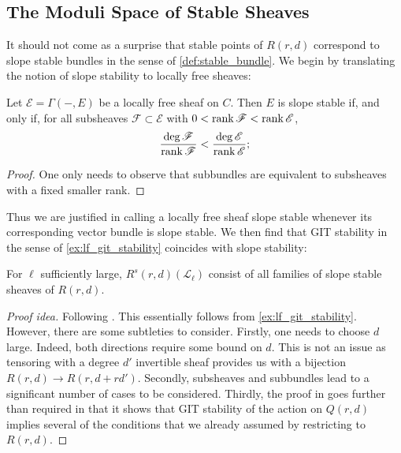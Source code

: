 \documentclass[12pt]{ociamthesis}  %
\begin{document}
\subsection{The Moduli Space of Stable Sheaves}

It should not come as a surprise that stable points of
$R(r,d)$ correspond to slope stable bundles
in the sense of \ref{def:stable_bundle}.
We begin by translating the notion of slope stability to
locally free sheaves:

\begin{lemma}
  Let $\mathscr E=\Gamma(-,E)$ be a locally free sheaf on $C$.
  Then $E$ is slope stable if, and only if, for all subsheaves
  $\mathscr F\subset\mathscr E$ with $0<\operatorname{rank}\mathscr F<\operatorname{rank}\mathscr E$,
  \begin{align}\label{eq:sheaf_slope_stability}
    \frac{\deg\mathscr F}{\operatorname{rank}\mathscr F}<\frac{\deg\mathscr E}{\operatorname{rank}\mathscr E};
  \end{align}
  \begin{proof}
    One only needs to observe that subbundles are equivalent to
    subsheaves with a fixed smaller rank.
  \end{proof}
\end{lemma}

Thus we are justified in calling a locally free sheaf slope stable
whenever its corresponding vector bundle is slope stable. We
then find that GIT stability in the sense of \ref{ex:lf_git_stability}
coincides with slope stability:

\begin{example}\label{thm:stability_of_lf_sheaves}
  For $\ell$ sufficiently large, $R^s(r,d)(\mathscr L_\ell)$
  consist of all families of  slope stable sheaves of $R(r,d)$.
  \begin{proof}[Proof idea]
    Following \cite[79-82]{hoskins2016}. This essentially follows
    from \ref{ex:lf_git_stability}. However, there are some subtleties
    to consider. Firstly, one needs to choose $d$ large. Indeed,
    both directions require some bound on $d$. This is
    not an issue as tensoring with a degree $d'$ invertible sheaf
    provides us with a bijection $R(r,d)\to R(r,d+rd')$.
    Secondly, subsheaves and subbundles lead to a significant number
    of cases to be considered. Thirdly, the proof in \cite{hoskins2016}
    goes further than required in that it shows that GIT stability
    of the action on $Q(r,d)$ implies several of the conditions that
    we already assumed by restricting to $R(r,d)$.
  \end{proof}
\end{example}
\end{document}
